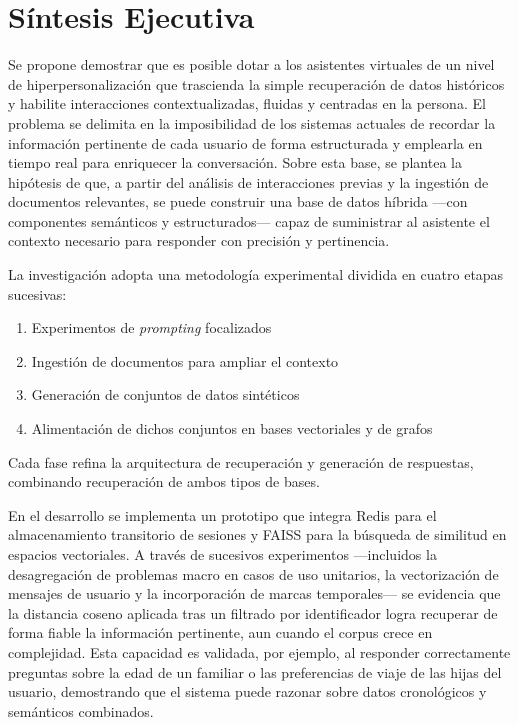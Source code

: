\section{Síntesis Ejecutiva}

Se propone demostrar que es posible dotar a los asistentes virtuales de un nivel de hiperpersonalización que trascienda la simple recuperación de datos históricos y habilite interacciones contextualizadas, fluidas y centradas en la persona. El problema se delimita en la imposibilidad de los sistemas actuales de recordar la información pertinente de cada usuario de forma estructurada y emplearla en tiempo real para enriquecer la conversación. Sobre esta base, se plantea la hipótesis de que, a partir del análisis de interacciones previas y la ingestión de documentos relevantes, se puede construir una base de datos híbrida —con componentes semánticos y estructurados— capaz de suministrar al asistente el contexto necesario para responder con precisión y pertinencia.

La investigación adopta una metodología experimental dividida en cuatro etapas sucesivas:

\begin{enumerate}
\item Experimentos de \textit{prompting} focalizados
\item Ingestión de documentos para ampliar el contexto
\item Generación de conjuntos de datos sintéticos
\item Alimentación de dichos conjuntos en bases vectoriales y de grafos
\end{enumerate}

Cada fase refina la arquitectura de recuperación y generación de respuestas, combinando recuperación de ambos tipos de bases.

En el desarrollo se implementa un prototipo que integra Redis para el almacenamiento transitorio de sesiones y FAISS para la búsqueda de similitud en espacios vectoriales. A través de sucesivos experimentos —incluidos la desagregación de problemas macro en casos de uso unitarios, la vectorización de mensajes de usuario y la incorporación de marcas temporales— se evidencia que la distancia coseno aplicada tras un filtrado por identificador logra recuperar de forma fiable la información pertinente, aun cuando el corpus crece en complejidad. Esta capacidad es validada, por ejemplo, al responder correctamente preguntas sobre la edad de un familiar o las preferencias de viaje de las hijas del usuario, demostrando que el sistema puede razonar sobre datos cronológicos y semánticos combinados.

